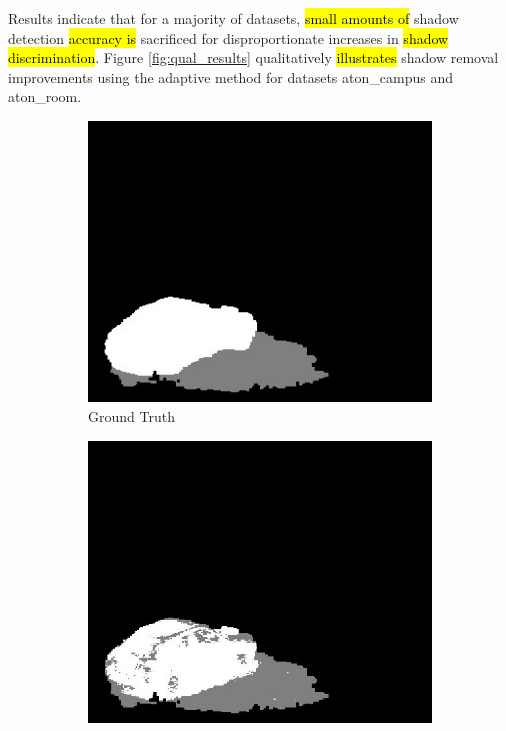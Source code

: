 \documentclass[12pt]{report}
\begin{document}
Results indicate that for a majority of datasets, \hl{small amounts of} shadow detection \hl{accuracy is} sacrificed for disproportionate increases in \hl{shadow discrimination}. Figure \ref{fig:qual_results} qualitatively \hl{illustrates} shadow removal improvements using the adaptive method for datasets aton\_campus and aton\_room.

\begin{figure}
  \centering
  \begin{subfigure}{.24\linewidth}
  \includegraphics[width=1\linewidth]{figures/model/campus_0061_gt.jpg}
  \caption{Ground Truth}
  \end{subfigure}
  \hfill
  \begin{subfigure}{.24\linewidth}
  \includegraphics[width=1\linewidth]{figures/model/campus_0061_optimal.jpg}

\end{subfigure}
\end{figure}
\end{document}
